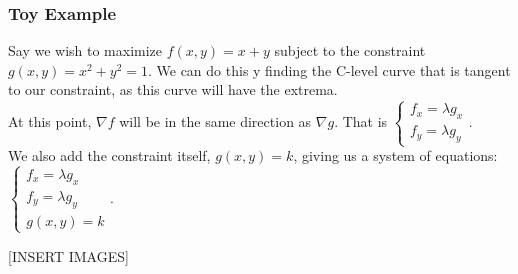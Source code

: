 \subsubsection{Toy Example}
\noindent
Say we wish to maximize $f(x,y)=x+y$ subject to the constraint $g(x,y)=x^2+y^2=1$. We can do this y finding the C-level curve that is tangent to our constraint, as this curve will have the extrema.\\
At this point, $\nabla f$ will be in the same direction as $\nabla g$. That is $\begin{cases} f_x=\lambda g_x \\ f_y=\lambda g_y\end{cases}$.\\
We also add the constraint itself, $g(x,y)=k$, giving us a system of equations: $\begin{cases}f_x=\lambda g_x \\ f_y=\lambda g_y \\ g(x,y)=k \end{cases}$.

[INSERT IMAGES]